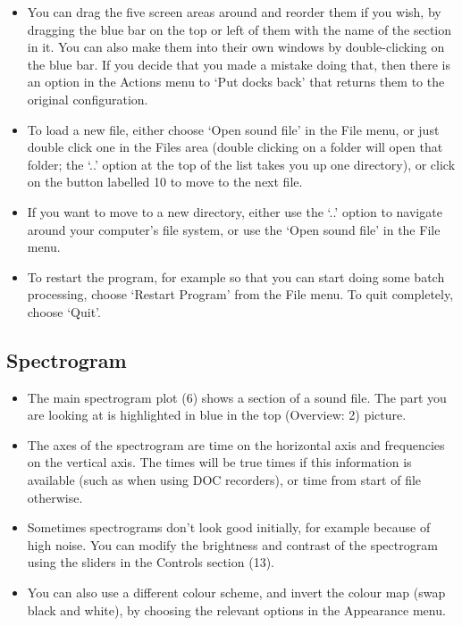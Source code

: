 \documentclass{article}
\begin{document}
\begin{itemize}
\item You can drag the five screen areas around and reorder them if you wish, by dragging the blue bar on the top or left of them with the name of the section in it. You can also make them into their own windows by double-clicking on the blue bar. If you decide that you made a mistake doing that, then there is an option in the Actions menu to `Put docks back' that returns them to the original configuration.

\item To load a new file, either choose `Open sound file' in the File menu, or just double click one in the Files area (double clicking on a folder will open that folder; the `..' option at the top of the list takes you up one directory), or click on the button labelled 10 to move to the next file.

\item If you want to move to a new directory, either use the `..' option to navigate around your computer's file system, or use the  `Open sound file' in the File menu.

\item To restart the program, for example so that you can start doing some batch processing, choose `Restart Program' from the File menu. To quit completely, choose `Quit'. 
\end{itemize}

\subsection{Spectrogram}\label{sec:spectrogram}

\begin{itemize}
\item The main spectrogram plot (6) shows a section of a sound file. The part you are looking at is highlighted in blue in the top (Overview: 2) picture.

\item The axes of the spectrogram are time on the horizontal axis and frequencies on the vertical axis. The times will be true times if this information is available (such as when using DOC recorders), or time from start of file otherwise. 

\item Sometimes spectrograms don't look good initially, for example because of high noise. You can modify the brightness and contrast of the spectrogram using the sliders in the Controls section (13). 
\item You can also use a different colour scheme, and invert the colour map (swap black and white), by choosing the relevant options in the Appearance menu.
\end{itemize}
\end{document}
